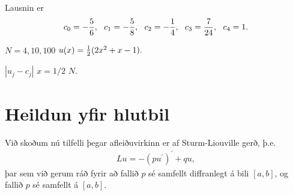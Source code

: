 \documentclass[a4paper,10pt,icelandic]{sphinxmanual}
\begin{document}
Lausnin er
\begin{equation*}
\begin{split}c_0=-{5\over 6},~~ c_1=-{5\over 8}, ~~ c_2 = -{1 \over 4},~~ c_3 = {7\over 24}, ~~ c_4 = 1.\end{split}
\end{equation*}

 \(N=4, 10, 100\)  \(u(x)={1 \over 2} (2 x^2+x-1).\)


 \(|u_j-c_j|\)    \(x=1/2\)    \(N\).


\section{Heildun yfir hlutbil}
\label{\detokenize{Kafli05:heildun-yfir-hlutbil}}\label{\detokenize{Kafli05:ch-5-2}}
Við skoðum nú tilfelli þegar afleiðuvirkinn er af Sturm-Liouville gerð, þ.e.
\begin{equation*}
\begin{split}L u= -(p u^\prime)^\prime+ q u,\end{split}
\end{equation*}
þar sem við gerum ráð fyrir að fallið \(p\) sé samfellt diffranlegt á bili \([a,b]\), og fallið \(p\) sé samfellt á \([a,b]\).
\end{document}
